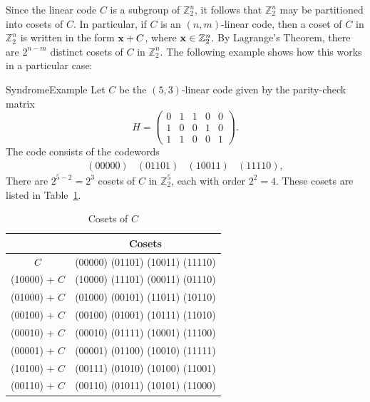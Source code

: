 Since the
linear code $C$ is a subgroup of $\mathbb{Z}_2^n$, it follows that $\mathbb{Z}_2^n$ 
may be partitioned into cosets of $C$. 
In particular,  if $C$ is an $(n,m)$-linear code, then a coset of $C$ in $\mathbb{Z}_2^n$ is written in
the form ${\bold x} + C$, where ${\bold x} \in \mathbb{Z}_2^n$. By Lagrange's Theorem, 
there are $2^{n-m}$ distinct cosets of $C$ in $\mathbb{Z}_2^n$. The following example shows how 
this works in a particular case:

 
\begin{example}{SyndromeExample}
Let $C$ be the $(5,3)$-linear code given by the parity-check matrix
\[
H =
\left(
\begin{array}{cccccc}
0 & 1 & 1 & 0 & 0 \\
1 & 0 & 0 & 1 & 0 \\
1 & 1 & 0 & 0 & 1
\end{array}
\right).
\]
The code consists of the codewords
\[
\begin{array}{cccc}
(00000)& (01101)& (10011)& (11110),
\end{array}
\]
There are $2^{5-2} = 2^3$ cosets of $C$ in $\mathbb{Z}_2^5$, each with
order $2^2 =4$.  These cosets are listed in Table~\ref{table:algcodes:cosets}. 
\end{example}
 
 
\begin{table}
\caption{Cosets of $C$\label{table:algcodes:cosets}}{\small
\begin{center}
\begin{tabular}{|c|c|}
\hline
 & Cosets \\
\hline
          $C$ & (00000)  (01101)  (10011)  (11110) \\
(10000) + $C$ & (10000)  (11101)  (00011)  (01110) \\
(01000) + $C$ & (01000)  (00101)  (11011)  (10110) \\
(00100) + $C$ & (00100)  (01001)  (10111)  (11010) \\
(00010) + $C$ & (00010)  (01111)  (10001)  (11100) \\
(00001) + $C$ & (00001)  (01100)  (10010)  (11111) \\
(10100) + $C$ & (00111)  (01010)  (10100)  (11001) \\
(00110) + $C$ & (00110)  (01011)  (10101)  (11000) \\
\hline
\end{tabular}
\end{center}
}
\end{table}
 
